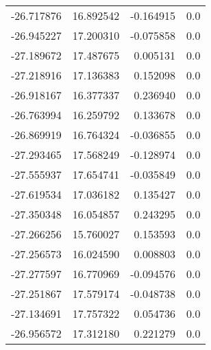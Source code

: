 \begin{tabular}{rrrr}
      -26.717876 &        16.892542 &   -0.164915 &   0.0 \\
      -26.945227 &        17.200310 &   -0.075858 &   0.0 \\
      -27.189672 &        17.487675 &    0.005131 &   0.0 \\
      -27.218916 &        17.136383 &    0.152098 &   0.0 \\
      -26.918167 &        16.377337 &    0.236940 &   0.0 \\
      -26.763994 &        16.259792 &    0.133678 &   0.0 \\
      -26.869919 &        16.764324 &   -0.036855 &   0.0 \\
      -27.293465 &        17.568249 &   -0.128974 &   0.0 \\
      -27.555937 &        17.654741 &   -0.035849 &   0.0 \\
      -27.619534 &        17.036182 &    0.135427 &   0.0 \\
      -27.350348 &        16.054857 &    0.243295 &   0.0 \\
      -27.266256 &        15.760027 &    0.153593 &   0.0 \\
      -27.256573 &        16.024590 &    0.008803 &   0.0 \\
      -27.277597 &        16.770969 &   -0.094576 &   0.0 \\
      -27.251867 &        17.579174 &   -0.048738 &   0.0 \\
      -27.134691 &        17.757322 &    0.054736 &   0.0 \\
      -26.956572 &        17.312180 &    0.221279 &   0.0 \\
\bottomrule
\end{tabular}
